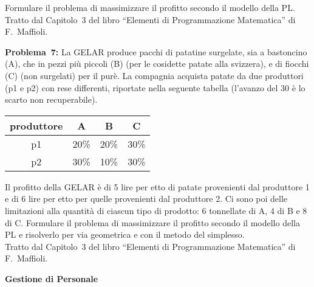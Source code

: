 \documentclass[11pt]{article}
\begin{document}
Formulare il problema di massimizzare il profitto
secondo il modello della PL.\\

Tratto dal Capitolo~3
del libro ``Elementi di Programmazione Matematica'' 
di F.~Maffioli.\\

\bigskip


{\sc \bf Problema~7\/:}
La GELAR produce pacchi di patatine surgelate,
sia a bastoncino (A),
che in pezzi pi\`u piccoli (B)
(per le cosidette patate alla svizzera),
e di fiocchi (C) (non surgelati) per il pur\`e.
La compagnia acquista patate da due produttori (p1 e p2)
con rese differenti,
riportate nella seguente tabella
(l'avanzo del 30%
\`e lo scarto non recuperabile).

\begin{center}
\begin{tabular}{|c|ccc|} \hline
produttore & A & B & C \\
\hline
   p1 & 20\% & 20\% & 30\% \\
   p2 & 30\% & 10\% & 30\% \\ 
\hline

\end{tabular}
\end{center}

Il profitto della GELAR \`e di 5 lire
per etto di patate provenienti dal produttore 1
e di 6 lire per etto per quelle provenienti dal produttore 2.
Ci sono poi delle limitazioni alla quantit\`a di ciascun
tipo di prodotto: 6 tonnellate di A, 4 di B e 8 di C.
Formulare il problema di massimizzare il profitto
secondo il modello della PL
e risolverlo per via geometrica e con il metodo del simplesso.\\

Tratto dal Capitolo~3
del libro ``Elementi di Programmazione Matematica'' 
di F.~Maffioli.\\

\bigskip

{\large \bf Gestione di Personale}\\
\end{document}
